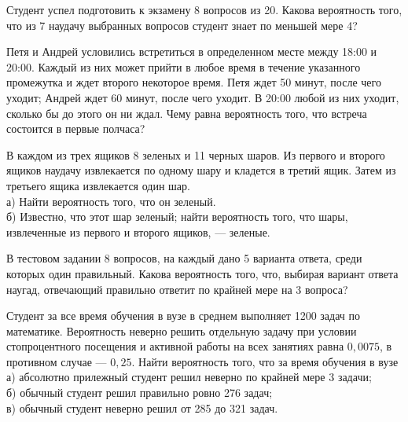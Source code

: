 \newpage\setcounter{zad}{0}



\begin{zkrW}{20}\noindent 
	Студент успел подготовить к экзамену 8 вопросов из 20. Какова вероятность того, что из 7 наудачу выбранных вопросов студент знает по меньшей мере 4?
 
\end{zkrW}

\begin{zkrW}{20}\noindent 
	Петя и Андрей условились встретиться в определенном месте между 18:00 и 20:00. Каждый из них может прийти в любое время в течение указанного промежутка и ждет второго некоторое время. Петя ждет 50 минут, после чего уходит; Андрей ждет 60 минут, после чего уходит. В 20:00 любой из них уходит, сколько бы до этого он ни ждал. Чему равна вероятность того, что встреча состоится в первые полчаса?
 
\end{zkrW}

\begin{zkrW}{20}\noindent 
	В каждом из трех ящиков 8 зеленых и 11 черных шаров. Из первого и второго ящиков наудачу извлекается по одному шару и кладется в третий ящик. Затем из третьего ящика извлекается один шар. \\ \indent а) Найти вероятность того, что он зеленый. \\ \indent б) Известно, что этот шар зеленый; найти вероятность того, что шары, извлеченные из первого и второго ящиков, --- зеленые.
 
\end{zkrW}

\begin{zkrW}{20}\noindent 
	В тестовом задании 8 вопросов, на каждый дано 5 варианта ответа, среди которых один правильный. Какова вероятность того, что, выбирая вариант ответа наугад, отвечающий правильно ответит по крайней мере на 3 вопроса?
 
\end{zkrW}

\begin{zkrW}{20}\noindent 
	Студент за все время обучения в вузе в среднем выполняет 1200 задач по математике. Вероятность неверно решить отдельную задачу при условии стопроцентного посещения и активной работы на всех занятиях равна $0{,}0075$, в противном случае --- $0{,}25$. Найти вероятность того, что за время обучения в вузе \\ \indent а) абсолютно прилежный студент решил неверно по крайней мере 3 задачи; \\ \indent б) обычный студент решил правильно ровно 276 задач; \\ \indent в) обычный студент неверно решил от 285 до 321 задач.
 
\end{zkrW}

